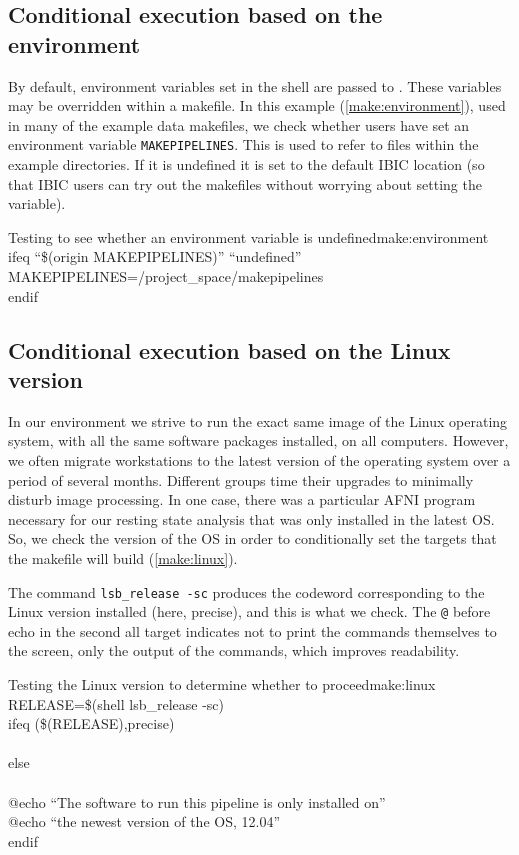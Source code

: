 \subsection{Conditional execution based on the environment}
By default, environment variables set in the shell are passed to \maken{}. These variables may be overridden within a makefile. In this example (\autoref{make:environment}), used in many of the example data makefiles, we check whether users have set an environment variable \texttt{MAKEPIPELINES}. This is used to refer to files within the example directories.  If it is undefined it is set to the default IBIC location (so that IBIC users can try out the makefiles without worrying about setting the variable).

\begin{make}{Testing to see whether an environment variable is undefined}{make:environment}
ifeq ``\$(origin MAKEPIPELINES)'' ``undefined'' \\
MAKEPIPELINES=/project_space/makepipelines \\
endif
\end{make}


\subsection{Conditional execution based on the Linux version}

In our environment we strive to run the exact same image of the Linux operating system, with all the same software packages installed, on all computers. However, we often migrate workstations to the latest version of the operating system over a period of several months. Different groups time their upgrades to minimally disturb image processing. In one case, there was a particular AFNI program necessary for our resting state analysis that was only installed in the latest OS. So, we check the version of the OS in order to conditionally set the targets that the makefile will build (\autoref{make:linux}).

The command \texttt{lsb_release -sc}  produces the codeword corresponding to the Linux version installed (here, precise), and this is what we check. The \texttt{@} before echo in the second all target indicates not to print the commands themselves to the screen, only the output of the commands, which improves readability.
\begin{make}{Testing the Linux version to determine whether to proceed}{make:linux}
RELEASE=\$(shell lsb_release -sc)\\

ifeq (\$(RELEASE),precise)\\
\\
else\\
 \\
\tab @echo ``The software to run this pipeline is only installed on'' \\
\tab @echo ``the newest version of the OS, 12.04'' \\
endif
\end{make}
